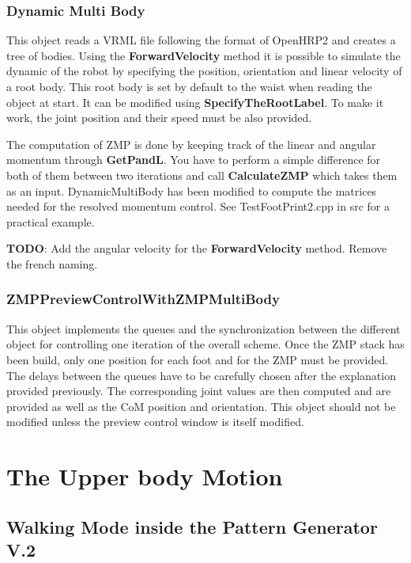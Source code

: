 \subsection{Dynamic Multi Body}
This object reads a VRML file following the format of OpenHRP2 and creates a tree
of bodies. Using the {\bf ForwardVelocity} method it is possible to simulate the
dynamic of the robot by specifying the position, orientation and linear velocity
of a root body. This root body is set by default to the waist when reading the
object at start. It can be modified using {\bf SpecifyTheRootLabel}.
To make it work, the joint position and their speed must be also provided.
\par
The computation of ZMP is done by keeping track of the linear and angular momentum
through {\bf GetPandL}. You have to perform a simple difference for both of them between two iterations
and call {\bf CalculateZMP} which takes them as an input.
DynamicMultiBody has been modified to compute the matrices needed for the resolved momentum control.
See TestFootPrint2.cpp in src for a practical example.

{\bf TODO}: Add the angular velocity for the {\bf ForwardVelocity} method.
Remove the french naming.

\subsection{ZMPPreviewControlWithZMPMultiBody}

This object implements the queues and the synchronization between the different object
for controlling one iteration of the overall scheme. Once the ZMP stack has been build,
only one position for each foot and for the ZMP must be provided.
The delays between the queues have to be carefully chosen after the explanation provided previously.
The corresponding joint values are then computed and are provided as well as the CoM
position and orientation.
This object should not be modified unless the preview control window is itself modified.

\chapter{The Upper body Motion}

\section{Walking Mode inside the Pattern Generator V.2 }

